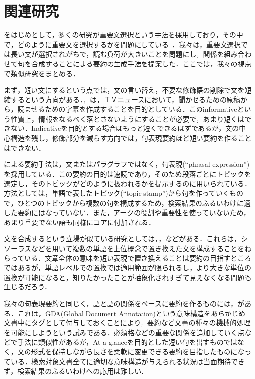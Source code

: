 \section{関連研究}
\cite{zechner96}をはじめとして，多くの研究が重要文選択という手法を採用しており，その中で，どのように重要文を選択するかを問題にしている~\cite{okumura98}．我々は，重要文選択では長い文が選択されがちで，読む負荷が大きいことを問題にし，関係を組み合わせて句を合成することによる要約の生成手法を提案した．ここでは，我々の視点で類似研究をまとめる．

まず，短い文にするという点では，文の言い替え，不要な修飾語の削除で文を短縮するという方向がある．\cite{wakao98}，\cite{mikami98}は，ＴＶニュースにおいて，聞かせるための原稿から，読ませるための字幕を作成することを目的としている．このinformativeという性質上，情報をなるべく落とさないようにすることが必要で，あまり短くはできない．Indicativeを目的とする場合はもっと短くできるはずであるが，文の中心構造を残し，修飾部分を減らす方向では，句表現要約ほど短い要約を作ることはできない．

\cite{boguraev97}による要約手法は，文またはパラグラフではなく，句表現(``phrasal expression'')を採用している．この要約の目的は速読であり，そのため段落ごとにトピックを選定し，そのトピックがどのように扱われるかを提示するのに用いられている．方法としては，単語で表したトピック(``topic stamp'')から句を作っていくもので，ひとつのトピックから複数の句を構成するため，検索結果のふるいわけに適した要約にはなっていない．また，アークの役割や重要性を使っていないため，あまり重要でない語も同様にコアに付加される．

文を合成するという立場が似ている研究としては，\cite{hovy97}，\cite{kondou96}などがある．これらは，シソーラスなどを用いて複数の単語を上位概念で置き換えた文を構成することをねらっている．文章全体の意味を短い表現で置き換えることは要約の目指すところではあるが，単語レベルでの置換では適用範囲が限られるし，より大きな単位の置換が可能になると，知りたかったことが抽象化されすぎて見えなくなる問題も生じるだろう．

我々の句表現要約と同じく，語と語の関係をベースに要約を作るものには，\cite{nagao97}がある．これは，GDA(Global Document Annotation)という意味構造をあらかじめ文書中にタグとして付与しておくことにより，要約など文書の種々の機械的処理を可能にしようという試みである．必須格などの重要な関係を追加していく点などで手法に類似性があるが，At-a-glanceを目的とした短い句を出すものではなく，文の形式を保持しながら長さを柔軟に変更できる要約を目指したものになっている．検索対象文書全てに適切な意味構造が与えられる状況は当面期待できず，検索結果のふるいわけへの応用は難しい．


